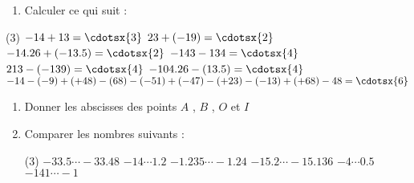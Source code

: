 \documentclass[a4paper,12pt]{article}
\begin{document}
\begin{exo}
\begin{enumerate}
\item Calculer ce qui suit : 
\end{enumerate}

\begin{tasks}(3)
\task $-14+13=\cdotsx{3}$
\task $23+(-19)=\cdotsx{2}$
\task $	-14.26+(-13.5)=\cdotsx{2}$
\task $-143-134=\cdotsx{4}$
\task $	213-(-139)=\cdotsx{4}$
\task $	-104.26-(13.5)=\cdotsx{4}$
\task* $-14-(-9)+(+48)-(68)-(-51)+(-47)-(+23)-(-13)+(+68)-48=\cdotsx{6}$
\end{tasks}
\end{exo}

\begin{exo}
\begin{enumerate}
\item Donner les abscisses des points $A$ , $B$ , $O$ et $I$ 

\item Comparer les nombres suivants :
\begin{tasks}(3)
\task $-33.5\cdots -33.48$
\task $-14\cdots 1.2$
\task $-1.235\cdots -1.24$
\task $-15.2\cdots -15.136$ 
\task $-4\cdots 0.5$
\task $-141\cdots -1$
\end{tasks}
\end{enumerate}
\end{exo}
\end{document}
